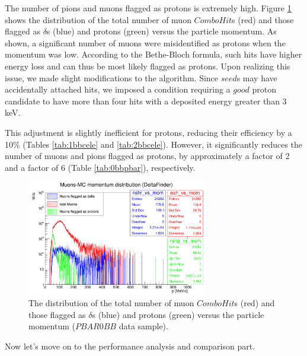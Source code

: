The number of pions and muons flagged as protons is extremely high. 
Figure \ref{fig:0pbarbefore} shows the distribution of the total 
number of muon $ComboHit$s (red) and those flagged as $\delta$s (blue) 
and protons (green) versus the particle momentum. 
As shown, a significant number of muons were misidentified 
as protons when the momentum was low. 
According to the Bethe-Bloch formula, such hits have 
higher energy loss and can thus be most likely flagged as 
protons. Upon realizing this issue, we made slight modifications to the 
algorithm. Since $seed$s may have accidentally attached hits, we imposed a 
condition requiring a $good$ proton candidate to have more than four 
hits with a deposited energy greater than 3 keV.

This adjustment is slightly inefficient for protons, reducing their 
efficiency by a 10\% (Tables \ref{tab:1bbcele} and \ref{tab:2bbcele}). 
However, it significantly reduces the 
number of muons and pions flagged as protons, by approximately 
a factor of 2 and a factor of 6 (Table \ref{tab:0bbpbar}), respectively.

 \begin{figure}[!h]
            \centering
            \includegraphics[width =0.7\textwidth]{figures/png/Screenshot_20240805_222923.png}
        \caption[The distribution of the total and flagged number of muon $ComboHit$s versus momentum.]{The 
        distribution of the total number of muon $ComboHit$s 
        (red) and those flagged as $\delta$s (blue) 
        and protons (green) versus the particle momentum ($PBAR0BB$ data sample). }
           \label{fig:0pbarbefore}
\end{figure}

Now let's move on to the performance analysis and comparison part.

